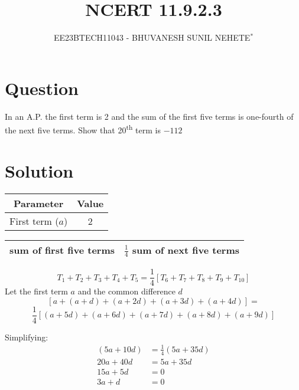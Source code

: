 \documentclass[journal,12pt,twocolumn]{IEEEtran}
\theoremstyle{remark}
\begin{document}

\vspace{3cm}

\title{NCERT 11.9.2.3}
\author{EE23BTECH11043 - BHUVANESH SUNIL NEHETE$^{*}$%
}
\maketitle
\newpage
\bigskip

\renewcommand{\thefigure}{\theenumi}
\renewcommand{\thetable}{\theenumi}



\section*{Question}

In an A.P. the first term is 2 and the sum of the first five terms is one-fourth of the next five terms. Show that 20\textsuperscript{th} term is $-112$

\section*{Solution}
\begin{table}[h]
  \centering
  \begin{tabular}{|c|c|}
    \hline
    \textbf{Parameter} & \textbf{Value} \\
    \hline
    First term (\(a\)) & 2 \\
    \hline
  \end{tabular}
\end{table}
\begin{table}[h]
    \centering
    \begin{tabular}{|c|c|}
        \hline
        sum of first five terms & $\frac{1}{4}$ sum of next five terms  \\\hline
    \end{tabular}
\end{table}

\[T_1 + T_2 + T_3 + T_4 + T_5 = \frac{1}{4} [T_6 + T_7 + T_8 + T_9 + T_{10}]\]
Let the first term \(a\) and the common difference \(d\)
\[[a + (a + d) + (a + 2d) + (a + 3d) + (a + 4d)] =\] 
\[\frac{1}{4} [(a + 5d) + (a + 6d) + (a + 7d) + (a + 8d) + (a + 9d)]\]


Simplifying:
    \begin{align}
    (5a + 10d) &= \frac{1}{4}(5a + 35d)\\
    20a + 40d &= 5a + 35d\\
    15a + 5d &= 0\\
    3a + d &= 0 
    \end{align}
\end{document}
